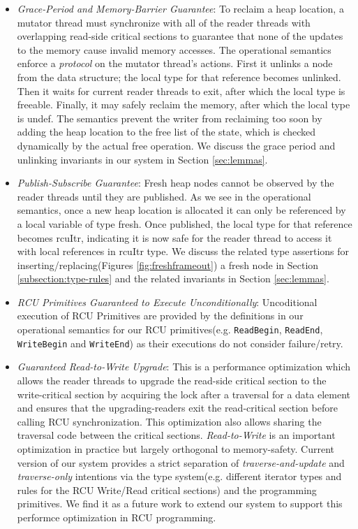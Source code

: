 \begin{itemize}
  \item \textit{Grace-Period and Memory-Barrier Guarantee}: To reclaim a heap location, a mutator thread must synchronize with all of the reader threads with overlapping read-side critical sections to guarantee that none of the updates to the memory cause invalid memory accesses.
The operational semantics enforce a \textit{protocol} on the mutator thread's actions. First it unlinks a node from the data structure; the local type for that reference becomes \textsf{unlinked}. Then it waits for current reader threads to exit, after which the local type is \textsf{freeable}. Finally, it may safely reclaim the memory, after which the local type is \textsf{undef}.
The semantics prevent the writer from reclaiming too soon by adding the heap location to the free list of the state, which is checked dynamically by the actual free operation. We discuss the grace period and unlinking invariants in our system in Section \ref{sec:lemmas}.
\item \textit{Publish-Subscribe Guarantee}: Fresh heap nodes cannot be observed by the reader threads until they are published. As we see in the operational semantics, once a new heap location is allocated it can only be referenced by a local variable of type \textsf{fresh}. Once published, the local type for that reference becomes \textsf{rcuItr}, indicating it is now safe for the reader thread to access it with local references in \textsf{rcuItr} type. We discuss the related type assertions for inserting/replacing(Figures \ref{fig:freshframeout}) a fresh node in Section \ref{subsection:type-rules} and the related invariants in Section \ref{sec:lemmas}.
\item \textit{RCU Primitives Guaranteed to Execute Unconditionally}: Uncoditional execution of RCU Primitives are provided by the definitions in our operational semantics for our RCU primitives(e.g. \lstinline|ReadBegin|, \lstinline|ReadEnd|, \lstinline|WriteBegin| and \lstinline|WriteEnd|) as their executions do not consider failure/retry.
\item \textit{Guaranteed Read-to-Write Upgrade}: This is a performance optimization which allows the reader threads to upgrade the read-side critical section to the write-critical section by acquiring the lock after a traversal for a data element and ensures that the upgrading-readers exit the read-critical section before calling RCU synchronization. This optimization also allows sharing the traversal code between the critical sections. \textit{Read-to-Write} is an important optimization in practice but largely orthogonal to memory-safety. Current version of our system provides a strict separation of \textit{traverse-and-update} and \textit{traverse-only} intentions via the type system(e.g. different iterator types and rules for the RCU Write/Read critical sections) and the programming primitives. We find it as a future work to extend our system to support this performce optimization in RCU programming.
  \end{itemize}
